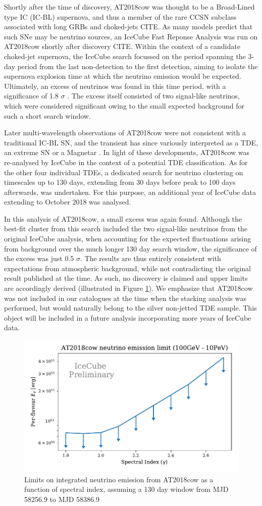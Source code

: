 \documentclass[twocolumn, tighten, linenumbers]{aastex62}
\begin{document}
Shortly after the time of discovery, AT2018cow was thought to be a Broad-Lined type IC (IC-BL) supernova, and thus a member of the rare CCSN subclass associated with long GRBs and choked-jets CITE. As many models predict that such SNe may be neutrino sources, an IceCube Fast Reponse Analysis was run on AT2018cow shortly after discovery CITE. Within the context of a candidate choked-jet supernova, the IceCube search focussed on the period spanning the 3-day period from the last non-detection to the first detection, aiming to isolate the supernova explosion time at which the neutrino emission would be expected. Ultimately, an excess of neutrinos was found in this time period, with a significance of 1.8 $\sigma$ \citep{2018ATel11785....1B}. The excess itself consisted of two signal-like neutrinos, which were considered significant owing to the small expected background for such a short search window.

Later multi-wavelength observations of AT2018cow were not consistent with a traditional IC-BL SN, and the transient has since variously interpreted as a TDE, an extreme SN or a Magnetar \citep{Perley:2018oky}. In light of these developments, AT2018cow was re-analysed by IceCube in the context of a potential TDE classification. As for the other four individual TDEs, a dedicated search for neutrino clustering on timescales up to 130 days, extending from 30 days before peak to 100 days afterwards, was undertaken.  For this purpose, an additional year of IceCube data extending to October 2018 was analysed.

In this analysis of AT2018cow, a small excess was again found. Although the best-fit cluster from this search included the two signal-like neutrinos from the original IceCube analysis, when accounting for the expected fluctuations arising from background over the much longer 130 day search window, the significance of the excess was just 0.5 $\sigma$. The results are thus entirely consistent with expectations from atmospheric background, while not contradicting the original result published at the time. As such, no discovery is claimed and upper limits are accordingly derived (illustrated in Figure \ref{fig:At2018cow}). We emphasize that AT2018cow was not included in our catalogues at the time when the stacking analysis was performed, but would naturally belong to the silver non-jetted TDE sample. This object will be included in a future analysis incorporating more years of IceCube data.

\begin{figure}[!ht]
	\centering \includegraphics[width=.45\textwidth]{figures/AT2018cow_limit_plot}
	\caption{Limits on integrated neutrino emission from AT2018cow as a function of spectral index, assuming a 130 day window from MJD 58256.9 to MJD 58386.9}
	\label{fig:At2018cow}
\end{figure}
\end{document}

